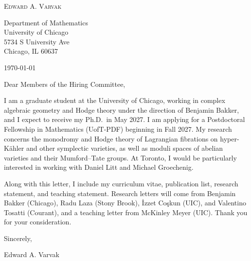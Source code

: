 \documentclass[12pt]{article}
\begin{document}
\begin{center}
  {\Large\textsc{Edward A. Varvak}}\\[10pt]
\end{center}

Department of Mathematics \\
University of Chicago \\
5734 S University Ave \\
Chicago, IL 60637

\today

Dear Members of the Hiring Committee,

I am a graduate student at the University of Chicago, working in complex
algebraic geometry and Hodge theory under the direction of Benjamin Bakker,
and I expect to receive my Ph.D.\ in May 2027. I am applying for a Postdoctoral
Fellowship in Mathematics (\mbox{UofT-PDF}) beginning in Fall 2027. My
research concerns the monodromy and Hodge theory of Lagrangian fibrations on
hyper-K\"ahler and other symplectic varieties, as well as moduli spaces of
abelian varieties and their Mumford--Tate groups. At Toronto, I would be
particularly interested in working with Daniel Litt and Michael Groechenig.

Along with this letter, I include my curriculum vitae, publication list,
research statement, and teaching statement. Research letters will come from
Benjamin Bakker (Chicago), Radu Laza (Stony Brook), \.{I}zzet Co\c{s}kun
(UIC), and Valentino Tosatti (Courant), and a teaching letter from McKinley
Meyer (UIC). Thank you for your consideration.

Sincerely,

Edward A. Varvak
\end{document}
